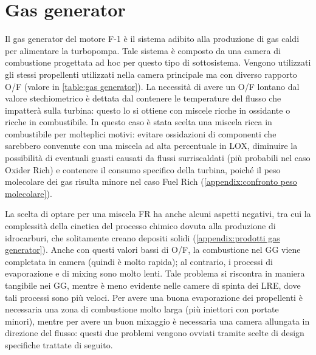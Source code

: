 \section{Gas generator}
\label{sec:gas generator}

Il gas generator del motore F-1 è il sistema adibito alla produzione di gas caldi per alimentare la turbopompa. Tale sistema è composto da una camera di combustione progettata ad hoc per questo tipo di sottosistema. Vengono utilizzati gli stessi propellenti utilizzati nella camera principale ma con diverso rapporto O/F (valore in \autoref{table:gas generator}). La necessità di avere un O/F lontano dal valore stechiometrico è dettata dal contenere le temperature del flusso che impatterà sulla turbina: questo lo si ottiene con miscele ricche in ossidante o ricche in combustibile. In questo caso è stata scelta una miscela ricca in combustibile per molteplici motivi: evitare ossidazioni di componenti che sarebbero convenute con una miscela ad alta percentuale in LOX, diminuire la possibilità di eventuali guasti causati da flussi surriscaldati (più probabili nel caso Oxider Rich) e contenere il consumo specifico della turbina, poiché il peso molecolare dei gas risulta minore nel caso Fuel Rich (\autoref{appendix:confronto peso molecolare}).

La scelta di optare per una miscela FR ha anche alcuni aspetti negativi, tra cui la complessità della cinetica del processo chimico dovuta alla produzione di idrocarburi, che solitamente creano depositi solidi (\autoref{appendix:prodotti gas generator}). Anche con questi valori bassi di O/F, la combustione nel GG viene completata in camera (quindi è molto rapida); al contrario, i processi di evaporazione e di mixing sono molto lenti. Tale problema si riscontra in maniera tangibile nei GG, mentre è meno evidente nelle camere di spinta dei LRE, dove tali processi sono più veloci. Per avere una buona evaporazione dei propellenti è necessaria una zona di combustione molto larga (più iniettori con portate minori), mentre per avere un buon mixaggio è necessaria una camera allungata in direzione del flusso: questi due problemi vengono ovviati tramite scelte di design specifiche trattate di seguito.

